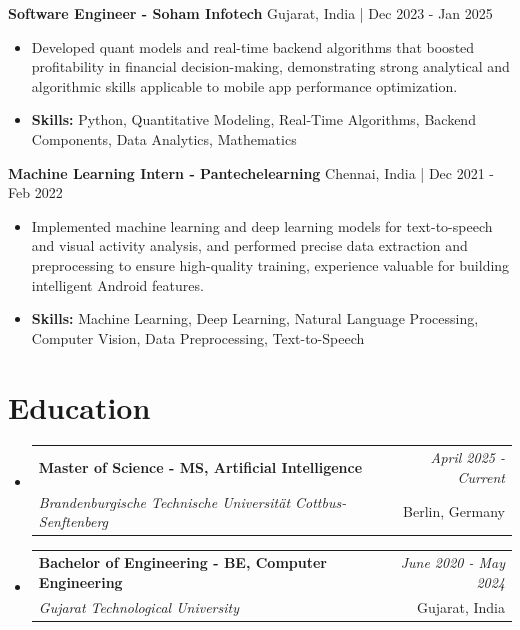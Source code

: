 \documentclass[a4paper,11pt]{article}
\makeatletter
\newcommand{\resumeSubheading}[4]{
\vspace{0.5mm}\item
    \begin{tabular*}{\linewidth}[t]{l@{\extracolsep{\fill}}r}
        \textbf{#1} & \textit{\footnotesize{#4}} \\
        \textit{\footnotesize{#3}} &  \footnotesize{#2}\\
    \end{tabular*}
    \vspace{-2.4mm}
}
\makeatother
\begin{document}
\vspace{1mm}
  \textbf{Software Engineer - Soham Infotech} \hfill Gujarat, India | Dec 2023 - Jan 2025
\vspace{-1.5mm} %
\begin{itemize}
  \item Developed quant models and real-time backend algorithms that boosted profitability in financial decision-making, demonstrating strong analytical and algorithmic skills applicable to mobile app performance optimization.

\vspace{-2mm}
  \item \textbf{Skills:} Python, Quantitative Modeling, Real-Time Algorithms, Backend Components, Data Analytics, Mathematics
\end{itemize}

\vspace{1mm}
  \textbf{Machine Learning Intern - Pantechelearning} \hfill Chennai, India | Dec 2021 - Feb 2022
\vspace{-1.5mm} %
\begin{itemize}
  \item Implemented machine learning and deep learning models for text-to-speech and visual activity analysis, and performed precise data extraction and preprocessing to ensure high-quality training, experience valuable for building intelligent Android features.
\vspace{-2mm}
  \item \textbf{Skills:} Machine Learning, Deep Learning, Natural Language Processing, Computer Vision, Data Preprocessing, Text-to-Speech
\end{itemize}\section{\textbf{Education}}
\vspace{-0.4mm}

\begin{itemize}[leftmargin=0.15in, label={}]
\resumeSubheading
{Master of Science - MS, Artificial Intelligence }{Berlin, Germany}
{Brandenburgische Technische Universität Cottbus-Senftenberg  }{April 2025 - Current}

\vspace{1.0mm} %
\resumeSubheading
{Bachelor of Engineering - BE, Computer Engineering  }{Gujarat, India}
{Gujarat Technological University }{June 2020 - May 2024}

\end{itemize}
\end{document}
